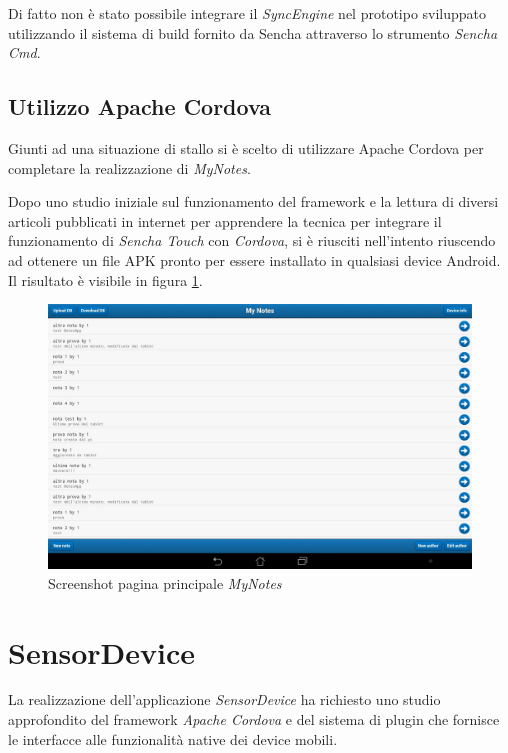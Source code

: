 Di fatto non è stato possibile integrare il \emph{SyncEngine} nel prototipo sviluppato utilizzando il sistema di build fornito da Sencha attraverso lo strumento \emph{Sencha Cmd}.

\subsection{Utilizzo Apache Cordova}
Giunti ad una situazione di stallo si è scelto di utilizzare Apache Cordova per completare la realizzazione di \emph{MyNotes}.

Dopo uno studio iniziale sul funzionamento del framework \cite{apache:cordova} e la lettura di diversi articoli pubblicati in internet \cite{andidog:packageSenchaPhonegap} \cite{sencha:senchaMVCphonegap} \cite{bgmemo:senchaPhonegap} per apprendere la tecnica per integrare il funzionamento di \emph{Sencha Touch} con \emph{Cordova}, si è riusciti nell'intento riuscendo ad ottenere un file \ac{APK} pronto per essere installato in qualsiasi device Android.
Il risultato è visibile in figura \ref{fig:screenshot mynotes}.

\begin{figure}[htb]
\centering
\includegraphics[scale=0.25]{gfx/screenshot/screen_MyNotes}
\caption{Screenshot pagina principale \emph{MyNotes}}
\label{fig:screenshot mynotes}
\end{figure}

\section{SensorDevice}
La realizzazione dell'applicazione \emph{SensorDevice} ha richiesto uno studio approfondito del framework \emph{Apache Cordova} \cite{apache:cordova} e del sistema di plugin che fornisce le interfacce alle funzionalità native dei device mobili.

